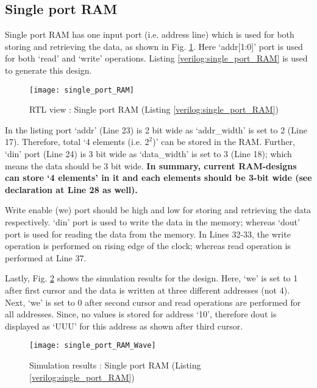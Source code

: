 \subsection{Single port RAM}
Single port RAM has one input port (i.e. address line) which is used for both storing and retrieving the data, as shown in Fig. \ref{fig:single_port_RAM}. Here `addr[1:0]' port is used for both `read' and `write' operations. Listing \ref{verilog:single_port_RAM} is used to generate this design. 
\begin{figure}[!h]
	\centering
	\texttt{[image: single\_port\_RAM]}
	\caption{RTL view : Single port RAM (Listing \ref{verilog:single_port_RAM})}
	\label{fig:single_port_RAM}
\end{figure}

\begin{explanation}
	In the listing port `addr' (Line 23) is 2 bit wide as `addr\_width' is set to 2 (Line 17). Therefore, total `4 elements (i.e. $2^2$)' can be stored in the RAM. Further, `din' port (Line 24) is 3 bit wide as `data\_width' is set to 3 (Line 18); which means the data should be 3 bit wide. \textbf{In summary, current RAM-designs can store `4 elements' in it and each elements should be 3-bit wide (see declaration at Line 28 as well).}
	
	Write enable (we) port should be high and low for storing and retrieving the data respectively. `din' port is used to write the data in the memory; whereas `dout' port is used for reading the data from the memory. In Lines 32-33, the write operation is performed on rising edge of the clock; whereas read operation is performed at Line 37. 
	
	
	
	Lastly, Fig. \ref{fig:single_port_RAM_Wave} shows the simulation results for the design. Here, `we' is set to 1 after first cursor and the data is written at three different addresses (not 4). Next, `we' is set to 0 after second cursor and read operations are performed for all addresses. Since, no values is stored for address `10', therefore dout is displayed as `UUU' for this address as shown after third cursor. 
	\begin{figure}[!h]
		\centering
		\texttt{[image: single\_port\_RAM\_Wave]}
		\caption{Simulation results : Single port RAM (Listing \ref{verilog:single_port_RAM})}
		\label{fig:single_port_RAM_Wave}
	\end{figure}
\end{explanation}

